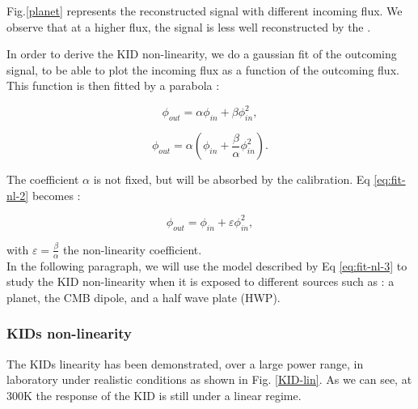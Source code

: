 Fig.\ref{planet} represents the reconstructed signal with different incoming flux. We observe that at a higher flux, the signal is less well reconstructed by the \rf.

In order to derive the KID non-linearity, we do a gaussian fit of the outcoming signal, to be able to plot the incoming flux as a function of the outcoming flux. This function is then fitted by a parabola :

\begin{equation}
\phi_{out} = \alpha \phi_{in} + \beta \phi_{in}^{2} ,
\label{eq:fit-nl-1}
\end{equation}

\begin{equation}
\phi_{out} = \alpha (\phi_{in} + \frac{\beta}{\alpha}  \phi_{in}^{2}).
\label{eq:fit-nl-2}
\end{equation}

The coefficient $\alpha$ is not fixed, but will be absorbed by the calibration. Eq \ref{eq:fit-nl-2} becomes :

\begin{equation}
\phi_{out} = \phi_{in} + \varepsilon \phi_{in}^{2},
\label{eq:fit-nl-3}
\end{equation}

with $\varepsilon = \frac{\beta}{\alpha}$ the non-linearity coefficient. \\
In the following paragraph, we will use the model described by Eq \ref{eq:fit-nl-3} to study the KID non-linearity when it is exposed to different sources such as : a planet, the CMB dipole, and a half wave plate (HWP).

\subsubsection{KIDs non-linearity}

The KIDs linearity has been demonstrated, over a large power range, in laboratory under realistic conditions as shown in Fig. \ref{KID-lin}. As we can see, at 300K the response of the KID is still under a linear regime.


